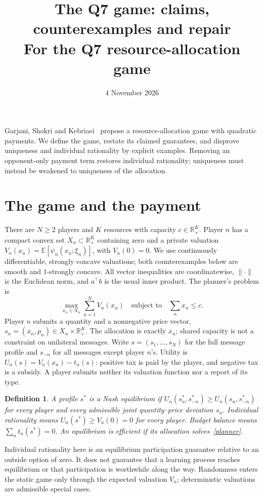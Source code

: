 \documentclass[11pt]{article}
\title{The Q7 game: claims, counterexamples and repair\\
\large For the Q7 resource-allocation game}
\author{}
\date{4 November 2026}
\newtheorem{definition}[theorem]{Definition}
\newcommand{\R}{\mathbb R}
\begin{document}
\maketitle
\vspace{-2em}

Garjani, Shokri and Kebriaei~\cite{q7} propose a resource-allocation
game with quadratic payments. We define the game, restate its claimed
guarantees, and disprove uniqueness and individual rationality by explicit
examples. Removing an opponent-only payment term restores individual
rationality; uniqueness must instead be weakened to uniqueness of the
allocation.

\section{The game and the payment}
There are $N\ge2$ players and $K$ resources with capacity
$c\in\R_+^K$. Player $n$ has a compact convex set
$X_n\subset\R_+^K$ containing zero and a private valuation
$V_n(x_n)=\mathbb E[\psi_n(x_n;\xi_n)]$, with $V_n(0)=0$. We use continuously differentiable, strongly concave
valuations; both counterexamples below are smooth and $1$-strongly concave.
All vector inequalities are coordinatewise, $\|\cdot\|$ is the Euclidean
norm, and $a^\top b$ is the usual inner product.
The planner's problem is
\begin{equation}\label{planner}
 \max_{x_n\in X_n}\sum_{n=1}^N V_n(x_n)
 \quad\text{subject to}\quad \sum_nx_n\le c.
\end{equation}
Player $n$ submits a quantity and a nonnegative price vector,
$s_n=(x_n,p_n)\in X_n\times\R_+^K$. The allocation is exactly $x_n$;
shared capacity is not a constraint on unilateral messages.
Write $s=(s_1,\ldots,s_N)$ for the full message profile and $s_{-n}$
for all messages except player $n$'s.
Utility is $U_n(s)=V_n(x_n)-t_n(s)$: positive tax is paid by the player,
and negative tax is a subsidy. A player submits neither its valuation
function nor a report of its type.

\begin{definition}
A profile $s^*$ is a Nash equilibrium if
$U_n(s_n^*,s_{-n}^*)\ge U_n(s_n,s_{-n}^*)$ for every player and every
admissible joint quantity--price deviation $s_n$.
Individual rationality means $U_n(s^*)\ge V_n(0)=0$ for every player.
Budget balance means $\sum_nt_n(s^*)=0$.
An equilibrium is efficient if its allocation solves~\eqref{planner}.
\end{definition}

Individual rationality here is an equilibrium participation guarantee
relative to an outside option of zero. It does not guarantee that a
learning process reaches equilibrium or that participation is worthwhile
along the way. Randomness enters the static game only through the expected
valuation $V_n$; deterministic valuations are admissible special cases.
\end{document}
